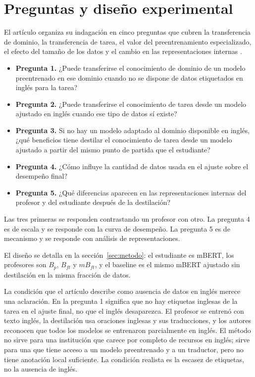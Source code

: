 \section{Preguntas y diseño experimental}
\label{sec:preguntas}

El artículo organiza su indagación en cinco preguntas que cubren la transferencia de dominio, la transferencia de tarea, el valor del preentrenamiento especializado, el efecto del tamaño de los datos y el cambio en las representaciones internas \cite{piperno2025}.

\begin{itemize}
  \item \textbf{Pregunta 1.} ¿Puede transferirse el conocimiento de dominio de un modelo preentrenado en ese dominio cuando no se dispone de datos etiquetados en inglés para la tarea?
  \item \textbf{Pregunta 2.} ¿Puede transferirse el conocimiento de tarea desde un modelo ajustado en inglés cuando ese tipo de datos sí existe?
  \item \textbf{Pregunta 3.} Si no hay un modelo adaptado al dominio disponible en inglés, ¿qué beneficios tiene destilar el conocimiento de tarea desde un modelo ajustado a partir del mismo punto de partida que el estudiante?
  \item \textbf{Pregunta 4.} ¿Cómo influye la cantidad de datos usada en el ajuste sobre el desempeño final?
  \item \textbf{Pregunta 5.} ¿Qué diferencias aparecen en las representaciones internas del profesor y del estudiante después de la destilación?
\end{itemize}

Las tres primeras se responden contrastando un profesor con otro. La pregunta 4 es de escala y se responde con la curva de desempeño. La pregunta 5 es de mecanismo y se responde con análisis de representaciones.

El diseño se detalla en la sección~\ref{sec:metodo}: el estudiante es mBERT, los profesores son $B_p$, $B_{ft}$ y $mB_{ft}$, y el baseline es el mismo mBERT ajustado sin destilación en la misma fracción de datos.

La condición que el artículo describe como ausencia de datos en inglés merece una aclaración. En la pregunta 1 significa que no hay etiquetas inglesas de la tarea en el ajuste final, no que el inglés desaparezca. El profesor se entrenó con texto inglés, la destilación usa oraciones inglesas y sus traducciones, y los autores reconocen que todos los modelos se entrenaron parcialmente en inglés. El método no sirve para una institución que carece por completo de recursos en inglés; sirve para una que tiene acceso a un modelo preentrenado y a un traductor, pero no tiene anotación local suficiente. La condición realista es la escasez de etiquetas, no la ausencia de inglés.
